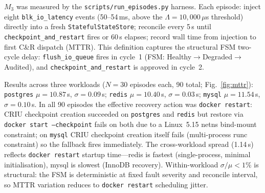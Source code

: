 \documentclass[conference]{IEEEtran}
\begin{document}
$M_3$ was measured by the \texttt{scripts/run\_episodes.py} harness. Each episode: inject eight \texttt{blk\_io\_latency} events (50--54\,ms, above the $\Lambda = 10{,}000\,\mu$s threshold) directly into a fresh \texttt{StatefulStateStore}; reconcile every 5\,s until \texttt{checkpoint\_and\_restart} fires or 60\,s elapses; record wall time from injection to first C\&R dispatch (MTTR). This definition captures the structural FSM two-cycle delay: \texttt{flush\_io\_queue} fires in cycle~1 (FSM: Healthy$\rightarrow$Degraded$\rightarrow$Audited), and \texttt{checkpoint\_and\_restart} is approved in cycle~2.

Results across three workloads ($N = 30$ episodes each, 90 total; Fig.~\ref{fig:mttr}): \texttt{postgres} $\mu = 10.87$\,s, $\sigma = 0.09$\,s; \texttt{redis} $\mu = 10.40$\,s, $\sigma = 0.03$\,s; \texttt{mysql} $\mu = 11.54$\,s, $\sigma = 0.10$\,s. In all 90 episodes the effective recovery action was \texttt{docker restart}: CRIU checkpoint creation succeeded on \texttt{postgres} and \texttt{redis} but restore via \texttt{docker start --checkpoint} fails on both due to a Linux~5.15 netns bind-mount constraint; on \texttt{mysql} CRIU checkpoint creation itself fails (multi-process runc constraint) so the fallback fires immediately. The cross-workload spread (1.14\,s) reflects \texttt{docker restart} startup time---redis is fastest (single-process, minimal initialisation), mysql is slowest (InnoDB recovery). Within-workload $\sigma/\mu < 1\%$ is structural: the FSM is deterministic at fixed fault severity and reconcile interval, so MTTR variation reduces to \texttt{docker restart} scheduling jitter.
\end{document}
